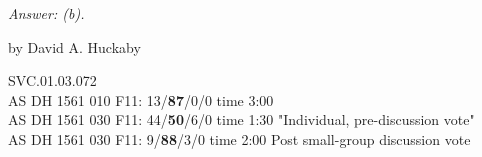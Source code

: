	
\emph{Answer: (b).}

	by David A. Huckaby

SVC.01.03.072 \\
AS DH 1561 010 F11: 13/{\bf87}/0/0 time 3:00  \\
AS DH 1561 030 F11: 44/{\bf50}/6/0 time 1:30 "Individual, pre-discussion vote" \\
AS DH 1561 030 F11: 9/{\bf88}/3/0 time 2:00 Post small-group discussion vote \\
